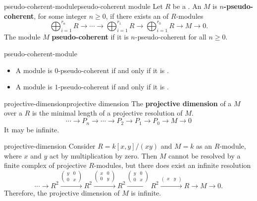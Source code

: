 \begin{topic}{pseudo-coherent-module}{pseudo-coherent module}
    Let $R$ be a . An  $M$ is \textbf{$n$-pseudo-coherent}, for some integer $n \ge 0$, if there exists an  of $R$-modules
    \[ \bigoplus_{i = 1}^{r_n} R \to \cdots \to \bigoplus_{i = 1}^{r_1} R \to \bigoplus_{i = 1}^{r_0} R \to M \to 0 . \]
    The module $M$ \textbf{pseudo-coherent} if it is $n$-pseudo-coherent for all $n \ge 0$.
\end{topic}

\begin{example}{pseudo-coherent-module}
    \begin{itemize}
        \item A module is $0$-pseudo-coherent if and only if it is .
        \item A module is $1$-pseudo-coherent if and only if it is .
    \end{itemize}
\end{example}

\begin{topic}{projective-dimension}{projective dimension}
    The \textbf{projective dimension} of a  $M$ over a  $R$ is the minimal length of a projective resolution of $M$.
    \[ \cdots \to P_n \to \cdots \to P_2 \to P_1 \to P_0 \to M \to 0 \]
    It may be infinite.
\end{topic}

\begin{example}{projective-dimension}
    Consider $R = k[x, y] / (xy)$ and $M = k$ as an $R$-module, where $x$ and $y$ act by multiplication by zero. Then $M$ cannot be resolved by a finite complex of projective $R$-modules, but there does exist an infinite resolution
    \[ \cdots \to R^2 \xrightarrow{\begin{pmatrix} y & 0 \\ 0 & x \end{pmatrix}} R^2 \xrightarrow{\begin{pmatrix} x & 0 \\ 0 & y \end{pmatrix}} R^2 \xrightarrow{\begin{pmatrix} y & 0 \\ 0 & x \end{pmatrix}} R^2 \xrightarrow{\begin{pmatrix} x & y \end{pmatrix}} R \to M \to 0 . \]
    Therefore, the projective dimension of $M$ is infinite.
\end{example}

